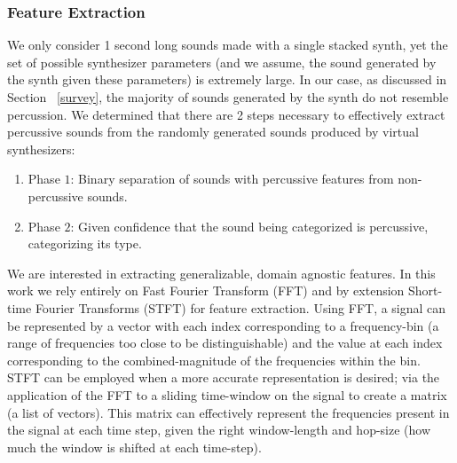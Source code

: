 \documentclass[\main/thesis.tex]{subfiles}
\begin{document}
\subsubsection{Feature Extraction}


We only consider 1 second long sounds made with a single stacked synth, yet the set of possible synthesizer parameters (and we assume, the sound generated by the synth given these parameters) is extremely large. In our case, as discussed in Section ~\ref{survey}, the majority of sounds generated by the synth do not resemble percussion.  We determined that there are 2 steps necessary to effectively extract percussive sounds
from the randomly generated sounds produced by virtual synthesizers: 
\begin{enumerate}
   \item  Phase $1$: Binary separation of sounds with percussive features from non-percussive sounds.
   \item Phase $2$: Given confidence that the sound being categorized is percussive, categorizing its type.
\end{enumerate}
We are interested in extracting generalizable, domain agnostic features. In this work we rely entirely on Fast Fourier Transform (FFT) and by extension Short-time Fourier Transforms (STFT) for feature extraction. Using FFT, a signal can be represented by a vector with each index corresponding to a frequency-bin (a range of frequencies too close to be distinguishable) and the value at each index corresponding to the combined-magnitude of the frequencies within the bin. STFT can be employed when a more accurate representation is desired; via the application of the FFT to a sliding time-window on the signal to create a matrix (a list of vectors). This matrix can effectively represent the frequencies present in the signal at each time step, given the right window-length and hop-size (how much the window is shifted at each time-step).
\end{document}
